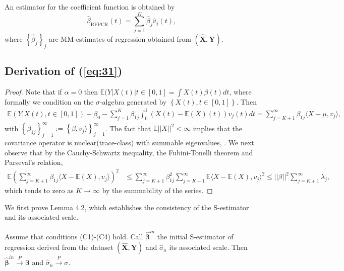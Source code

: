 \documentclass[11pt]{article}
\newenvironment{customlem}[1]
  {\renewcommand\theinnercustomlem{#1}\innercustomlem}
  {\endinnercustomlem}
\begin{document}
An estimator for the coefficient function is obtained by 
\begin{equation*}
\widehat{\beta}_{{\scriptscriptstyle \text{RFPCR}}}(t) = \sum_{j=1}^K \widehat{\beta}_j \widehat{v}_j(t),
\end{equation*}
where $\left\{ \widehat{\beta}_{j} \right\}_{j}$ are MM-estimates of regression obtained from $(\mathbf{\widehat{X}}, \mathbf{Y} )$. 


\subsection*{Derivation of (\ref{eq:31})}

\begin{proof}

Note that if $\alpha = 0$ then $\mathbb{E}(Y|X(t)| t\in [0,1] = \int X(t) \beta(t) dt$, where formally we condition on the $\sigma$-algebra generated by $\left\{X(t), t \in [0,1] \right\}$. Then
\begin{align*}
\mathbb{E}\left(Y|X(t), t\in [0,1]\right) - \beta_0 - \sum_{j=1}^K \beta_{1j} \int_{0}^1 (X(t)-\mathbb{E}(X)(t)) v_j(t) dt = \sum_{j=K+1}^{\infty} \beta_{1j} \langle X-\mu, v_j \rangle,
\end{align*}
with $\left\{\beta_{1j} \right\}_{j=1}^\infty := \left\{ \beta, v_j \rangle \right\}_{j=1}^{\infty}$. The fact that $\mathbb{E}|| X ||^2 < \infty$ implies that the covariance operator is nuclear(trace-class) with summable eigenvalues, \citep{hsing2015theoretical}. We next observe that by the Cauchy-Schwartz inequality, the Fubini-Tonelli theorem and Parseval's relation,
\begin{align*}
\mathbb{E}\left( \sum_{j=K+1}^{\infty} \beta_{1j} \langle X-\mathbb{E}(X), v_j \rangle \right)^2 &  \leq \sum_{j=K+1}^{\infty} \beta_{1j}^2  \sum_{j=K+1}^{\infty} 
\mathbb{E} \langle X-\mathbb{E}(X), v_j \rangle^2  \leq || \beta ||^2 \sum_{j=K+1}^{\infty} \lambda_j,
\end{align*}
which tends to zero as $K\to \infty$ by the summability of the series.

\end{proof}

We first prove Lemma 4.2, which establishes the consistency of the S-estimator and its associated scale.

\begin{customlem}{4.2}
Assume that conditions (C1)-(C4) hold. Call $\widehat{\boldsymbol{\beta}}^{in}$ the initial S-estimator of regression derived from the dataset $ (\mathbf{\widehat{X}}, \mathbf{Y})$ and $\widehat{\sigma}_n$ its associated scale. Then $\widehat{\boldsymbol{\beta}}^{in} \xrightarrow{P} \boldsymbol{\beta}$ and $\widehat{\sigma}_n \xrightarrow{P} \sigma$.  
\end{customlem}
\end{document}
